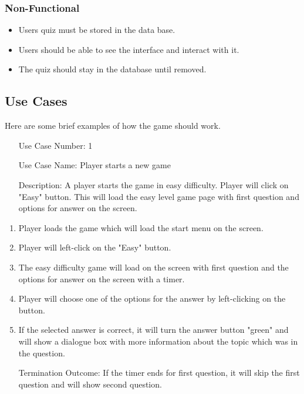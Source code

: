 \documentclass[10pt,conference,onecolumn,compsoc]{IEEEtran}
\begin{document}
\subsubsection{Non-Functional}
\begin{itemize}
\item Users quiz must be stored in the data base.
\item Users should be able to see  the interface and interact with it.
\item The quiz should stay in the database until removed. 
\end{itemize}

\subsection{Use Cases}
Here are some brief examples of how the game should work.





\label{tab:useCaseIndex}



\begin{itemize}
\item[Use Case Number:] 1
\item[Use Case Name:] Player starts a new game
\item[Description:] A player starts the game in easy difficulty. Player will click on "Easy" button. This will load the easy level game page with first question and options for answer on the screen.
\end{itemize}


\begin{enumerate}
\item Player loads the game which will load the start menu on the screen.
\item Player will left-click on the "Easy" button.
\item The easy difficulty game will load on the screen with first question and the options for answer on the screen with a timer.
\item Player will choose one of the options for the answer by left-clicking on the button.
\item If the selected answer is correct, it will turn the answer button "green" and will show a dialogue box with more information about the topic which was in the question.
\item[Termination Outcome:] If the timer ends for first question, it will skip the first question and will show second question.
\end{enumerate}
\end{document}
